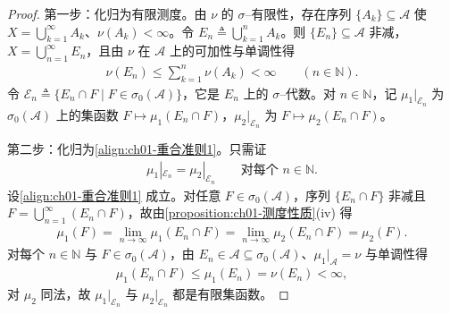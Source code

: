 \documentclass[../../main.tex]{subfiles}%
\begin{document}
\begin{proof}
第一步：化归为有限测度。由 $\nu$ 的 $\sigma$--有限性，存在序列 $\{A_k\}\subseteq\mathcal{A}$ 使 $X=\bigcup_{k=1}^\infty A_k$、$\nu(A_k)<\infty$。令 $E_n\triangleq\bigcup_{k=1}^n A_k$。则 $\{E_n\}\subseteq\mathcal{A}$ 非减，$X=\bigcup_{n=1}^\infty E_n$，且由 $\nu$ 在 $\mathcal{A}$ 上的可加性与单调性得
\begin{align*}
\nu(E_n)\leqslant\sum_{k=1}^n\nu(A_k)<\infty\qquad(n\in\mathbb{N}).
\end{align*}
令 $\mathcal{E}_n\triangleq\{E_n\cap F\mid F\in\sigma_0(\mathcal{A})\}$，它是 $E_n$ 上的 $\sigma$--代数。对 $n\in\mathbb{N}$，记 $\mu_1|_{\mathcal{E}_n}$ 为 $\sigma_0(\mathcal{A})$ 上的集函数 $F\mapsto\mu_1(E_n\cap F)$，$\mu_2|_{\mathcal{E}_n}$ 为 $F\mapsto\mu_2(E_n\cap F)$。

第二步：化归为\eqref{align:ch01-重合准则1}。只需证
\begin{align}
\mu_1|_{\mathcal{E}_n}=\mu_2|_{\mathcal{E}_n}\qquad\text{对每个 }n\in\mathbb{N}.\label{align:ch01-重合准则1}
\end{align}
设\eqref{align:ch01-重合准则1} 成立。对任意 $F\in\sigma_0(\mathcal{A})$，序列 $\{E_n\cap F\}$ 非减且 $F=\bigcup_{n=1}^\infty(E_n\cap F)$，故由\cref{proposition:ch01-测度性质}(iv) 得
\begin{align*}
\mu_1(F)=\lim_{n\to\infty}\mu_1(E_n\cap F)=\lim_{n\to\infty}\mu_2(E_n\cap F)=\mu_2(F).
\end{align*}
对每个 $n\in\mathbb{N}$ 与 $F\in\sigma_0(\mathcal{A})$，由 $E_n\in\mathcal{A}\subseteq\sigma_0(\mathcal{A})$、$\mu_1|_{\mathcal{A}}=\nu$ 与单调性得
\begin{align*}
\mu_1(E_n\cap F)\leqslant\mu_1(E_n)=\nu(E_n)<\infty,
\end{align*}
对 $\mu_2$ 同法，故 $\mu_1|_{\mathcal{E}_n}$ 与 $\mu_2|_{\mathcal{E}_n}$ 都是有限集函数。


\end{proof}
\end{document}
